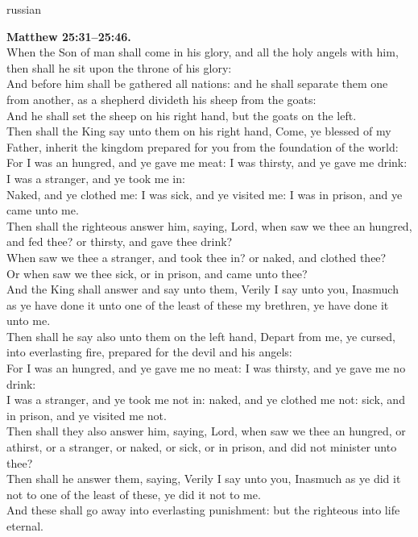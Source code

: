 \documentclass[10pt]{article} %
\begin{document}
{\begin{minipage}[t]{0.45\textwidth}
\begin{otherlanguage*}{russian}
\end{otherlanguage*}
\end{minipage}
\hfill
\begin{minipage}[t]{0.45\textwidth}

\textbf{Matthew 25:31--25:46.}\\
When the Son of man shall come in his glory, and all the holy angels with him, then shall he sit upon the throne of his glory:\\
And before him shall be gathered all nations: and he shall separate them one from another, as a shepherd divideth his sheep from the goats:\\
And he shall set the sheep on his right hand, but the goats on the left.\\
Then shall the King say unto them on his right hand, Come, ye blessed of my Father, inherit the kingdom prepared for you from the foundation of the world:\\
For I was an hungred, and ye gave me meat: I was thirsty, and ye gave me drink: I was a stranger, and ye took me in:\\
Naked, and ye clothed me: I was sick, and ye visited me: I was in prison, and ye came unto me.\\
Then shall the righteous answer him, saying, Lord, when saw we thee an hungred, and fed thee? or thirsty, and gave thee drink?\\
When saw we thee a stranger, and took thee in? or naked, and clothed thee?\\
Or when saw we thee sick, or in prison, and came unto thee?\\
And the King shall answer and say unto them, Verily I say unto you, Inasmuch as ye have done it unto one of the least of these my brethren, ye have done it unto me.\\
Then shall he say also unto them on the left hand, Depart from me, ye cursed, into everlasting fire, prepared for the devil and his angels:\\
For I was an hungred, and ye gave me no meat: I was thirsty, and ye gave me no drink:\\
I was a stranger, and ye took me not in: naked, and ye clothed me not: sick, and in prison, and ye visited me not.\\
Then shall they also answer him, saying, Lord, when saw we thee an hungred, or athirst, or a stranger, or naked, or sick, or in prison, and did not minister unto thee?\\
Then shall he answer them, saying, Verily I say unto you, Inasmuch as ye did it not to one of the least of these, ye did it not to me.\\
And these shall go away into everlasting punishment: but the righteous into life eternal.\\

\end{minipage}}
\end{document}
